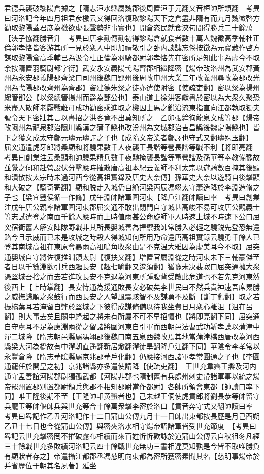君德兵襲破黎陽倉據之【隋志洹水縣屬魏郡後周置洹于元翻又音桓帥所類翻　考異曰河洛記今年四月祖君彦檄云又得回洛復取黎陽天下之倉盡非隋有而九月魏徵啓方勸取黎陽蓋君彦為檄欲虚張聲勢非事實也】開倉恣民就食浹旬間得勝兵二十餘萬【浹子恊翻勝音升　考異曰唐李勣傳勣初得黎陽倉就食者數十萬人魏徵高季輔杜正倫郭孝恪皆客游其所一見於衆人中即加禮敬引之卧内談謔忘倦按徵為元寶藏作啓方謀取黎陽倉高季輔已為汲令杜正倫為羽騎都尉郭孝恪先在密所足知此事為虚今不取　余按隋置羽騎尉都字衍】武安永安義陽弋陽齊郡相繼降密【煬帝改洛州為武安郡黃州為永安郡義陽郡齊梁曰司州後魏曰郢州後周改申州大業二年改義州尋改為郡改光州為弋陽郡改齊州為齊郡】竇建德朱粲之徒亦遣使附密【使疏吏翻】密以粲為揚州總管鄧公【以粲總管揚州而爵為鄧公也】泰山道士徐洪客獻書於密以為大衆久聚恐米盡人散師老厭戰難可成功勸密乘進取之機因士馬之鋭沿流東指直向江都執取獨夫號令天下密壯其言以書招之洪客竟不出莫知所之　乙卯張綸徇龍泉文成等郡【煬帝改隰州為龍泉郡治隰川縣漢之蒲子縣也改汾州為文城郡治吉昌縣後魏定陽縣也】皆下之獲文成太守鄭元璹元璹譯之子也【成隋文帝業者鄭譯也守式又翻璹殊玉翻】　屈突通遣虎牙郎將桑顯和將驍果數千人夜襲王長諧等營長諧等戰不利【將即亮翻　考異曰創業注云桑顯和帥驍果精兵數千夜馳掩襲長諧等軍營諧及孫華等奉教備豫故並覺之伺和赴營設伏分擊應時摧散唐高祖本紀云義師不利太宗以遊騎數百掩其後顯和潰散按太宗時未過河西今從高祖實錄及唐史大奈傳】孫華史大奈以遊騎自後擊顯和大破之【騎奇寄翻】顯和脱走入城仍自絶河梁丙辰馮翊太守蕭造降於李淵造脩之子也【梁宜豐侯循一作脩】戊午淵帥諸軍圍河東【降戶江翻帥讀曰率　考異曰創業注戊午唐公親率諸軍圍河東郡屈突通不敢出閉門自守城甚高峻不易可攻唐公觀義士等志試遣登之南面千餘人應時而上時值雨甚公命旋師軍人時速上城不時速下公曰屈突宿衛舊人解安陣隊野戰非其所長嬰城善為捍禦我師常勝入必輕之驍鋭先登恐無還路今且示威而已未是攻城之時殺人得城知何所用乃命還唐高祖實錄云驍勇千餘人已登其南城高祖在東原會暴雨高祖鳴角收衆由是不克温大雅因為虚美耳今不取】屈突通嬰城自守將佐復推淵領太尉【復扶又翻】增置官屬淵從之時河東未下三輔豪傑至者日以千數淵欲引兵西趣長安【趣七喻翻又逡須翻】猶豫未决裴寂曰屈突通擁大衆憑堅城吾捨之而去若進攻長安不克退為河東所踵腹背受敵此危道也不若先克河東然後西上【上時掌翻】長安恃通為援通敗長安必破矣李世民曰不然兵貴神速吾席累勝之威撫歸順之衆鼓行而西長安之人望風震駭智不及謀勇不及斷【斷丁亂翻】取之若振槁葉耳若淹留自弊於堅城之下彼得成謀脩備以待我坐費日月衆心離沮【沮在呂翻】則大事去矣且關中蜂起之將未有所屬不可不早招懷也【將即亮翻下同】屈突通自守虜耳不足為慮淵兩從之留諸將圍河東自引軍而西朝邑法曹武功靳孝謨以蒲津中潬二城降【隋志朝邑縣屬馮翊郡後魏曰南五泉西魏改焉其地當蒲津橋西唐改為河西縣梁大河為橋故有中潬朝直遥翻靳居焮翻潬徒旱翻降戶江翻下同】華隂令李孝常以永豐倉降【隋志華隂縣屬京兆郡華戶化翻】仍應接河西諸軍孝常圓通之子也【李圓通寵任於開皇之初】京兆諸縣亦多遣使請降【使疏吏翻】　王世充韋霽王辯及河内通守孟善誼河陽郡尉獨孤武都【河陽非郡也隋制舊有兵處州刺史帶諸軍事以統之煬帝罷州置郡别置都尉領兵與郡不相知郡尉當作都尉】各帥所領會東都【帥讀曰率下同】唯王隆後期不至【王隆帥卭黄蠻者也】己未越王侗使虎賁郎將劉長恭等帥留守兵龎玉等帥偃師兵與世充等合十餘萬衆擊李密於洛口【賁音奔守式又翻帥讀曰率　考異曰畧記作乙丑河洛記作十二日蒲山公傳九月十一日師出東都按長歷是月己酉朔乙丑十七日也今從蒲山公傳】與密夾洛水相守煬帝詔諸軍皆受世充節度　【考異曰畧記云世充擊密罔不摧破露布相續而來百姓忻忻歡詠於道蒲山公傳云自秋徂冬凡經三十餘戰世充多敗績河洛記云四十餘戰世充無功三書相違莫知孰是今皆不取唯勝負有顯狀者存之】帝遣攝江都郡丞馮慈明向東都為密所獲密素聞其名【慈明事煬帝於并省歷位于朝其名夙著】延坐